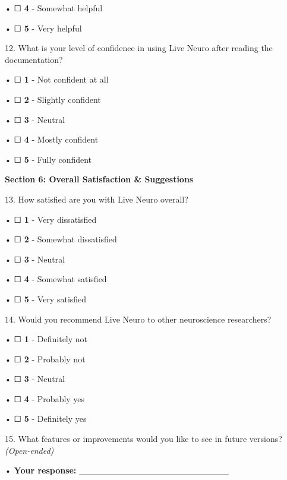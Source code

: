 \documentclass[
]{article}
\begin{document}
• ☐ \textbf{4} - Somewhat helpful

• ☐ \textbf{5} - Very helpful

12. What is your level of confidence in using Live Neuro after reading
the documentation?

• ☐ \textbf{1} - Not confident at all

• ☐ \textbf{2} - Slightly confident

• ☐ \textbf{3} - Neutral

• ☐ \textbf{4} - Mostly confident

• ☐ \textbf{5} - Fully confident

\textbf{Section 6: Overall Satisfaction \& Suggestions}

13. How satisfied are you with Live Neuro overall?

• ☐ \textbf{1} - Very dissatisfied

• ☐ \textbf{2} - Somewhat dissatisfied

• ☐ \textbf{3} - Neutral

• ☐ \textbf{4} - Somewhat satisfied

• ☐ \textbf{5} - Very satisfied

14. Would you recommend Live Neuro to other neuroscience researchers?

• ☐ \textbf{1} - Definitely not

• ☐ \textbf{2} - Probably not

• ☐ \textbf{3} - Neutral

• ☐ \textbf{4} - Probably yes

• ☐ \textbf{5} - Definitely yes

15. What features or improvements would you like to see in future
versions? \emph{(Open-ended)}

• \textbf{Your response:}
\_\_\_\_\_\_\_\_\_\_\_\_\_\_\_\_\_\_\_\_\_\_\_\_
\end{document}
